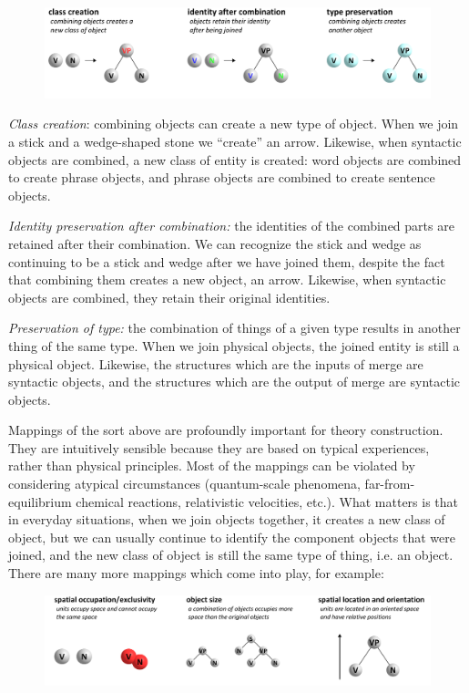   
\begin{figure}
\includegraphics[width=\textwidth]{figures/Tilsen-img29.png}
\caption{\missingcaption}
\label{fig:}
\end{figure}
 

\textit{Class creation}: combining objects can create a new type of object. When we join a stick and a wedge-shaped stone we “create” an arrow. Likewise, when syntactic objects are combined, a new class of entity is created: word objects are combined to create phrase objects, and phrase objects are combined to create sentence objects. 

\textit{Identity preservation after combination:} the identities of the combined parts are retained after their combination. We can recognize the stick and wedge as continuing to be a stick and wedge after we have joined them, despite the fact that combining them creates a new object, an arrow. Likewise, when syntactic objects are combined, they retain their original identities.

\textit{Preservation of type:} the combination of things of a given type results in another thing of the same type. When we join physical objects, the joined entity is still a physical object. Likewise, the structures which are the inputs of merge are syntactic objects, and the structures which are the output of merge are syntactic objects.

  Mappings of the sort above are profoundly important for theory construction. They are intuitively sensible because they are based on typical experiences, rather than physical principles. Most of the mappings can be violated by considering atypical circumstances (quantum-scale phenomena, far-from-equilibrium chemical reactions, relativistic velocities, etc.). What matters is that in everyday situations, when we join objects together, it creates a new class of object, but we can usually continue to identify the component objects that were joined, and the new class of object is still the same type of thing, i.e. an object. There are many more mappings which come into play, for example:

  
\begin{figure}
\includegraphics[width=\textwidth]{figures/Tilsen-img30.png}
\caption{\missingcaption}
\label{fig:}
\end{figure}
 

